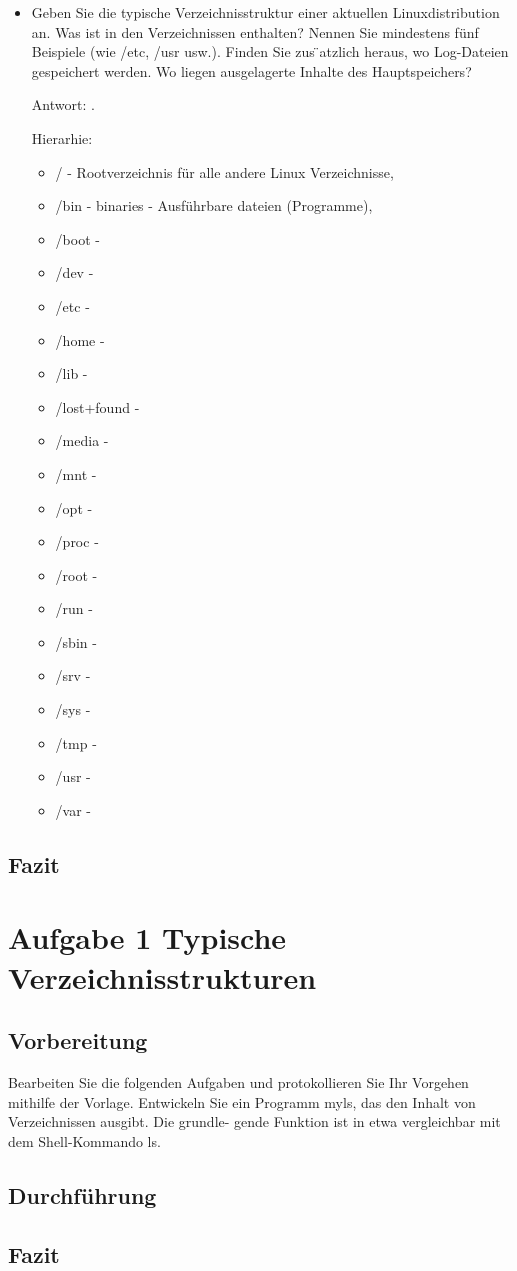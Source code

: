 
	\begin{itemize}
		\item Geben Sie die typische Verzeichnisstruktur einer aktuellen Linuxdistribution an. Was ist
		in den Verzeichnissen enthalten? Nennen Sie mindestens fünf Beispiele (wie /etc, /usr
		usw.). Finden Sie zus ̈atzlich heraus, wo Log-Dateien gespeichert werden.
		Wo liegen ausgelagerte Inhalte des Hauptspeichers?

		Antwort: .

		Hierarhie:
		\begin{itemize}
			\item / - Rootverzeichnis für alle andere Linux Verzeichnisse,
			\item /bin - binaries - Ausführbare dateien (Programme),
			\item /boot -
			\item /dev -
			\item /etc -
			\item /home -
			\item /lib -
			\item /lost+found -
			\item /media -
			\item /mnt -
			\item /opt -
			\item /proc -
			\item /root -
			\item /run -
			\item /sbin -
			\item /srv -
			\item /sys -
			\item /tmp -
			\item /usr -
			\item /var -

		\end{itemize}



	\end{itemize}

	\subsection{Fazit}

\newpage
\section{Aufgabe 1 Typische Verzeichnisstrukturen}
\subsection{Vorbereitung}
Bearbeiten Sie die folgenden Aufgaben und protokollieren Sie Ihr Vorgehen mithilfe der Vorlage.
Entwickeln Sie ein Programm myls, das den Inhalt von Verzeichnissen ausgibt. Die grundle-
gende Funktion ist in etwa vergleichbar mit dem Shell-Kommando ls.

\subsection{Durchführung}

\subsection{Fazit}
